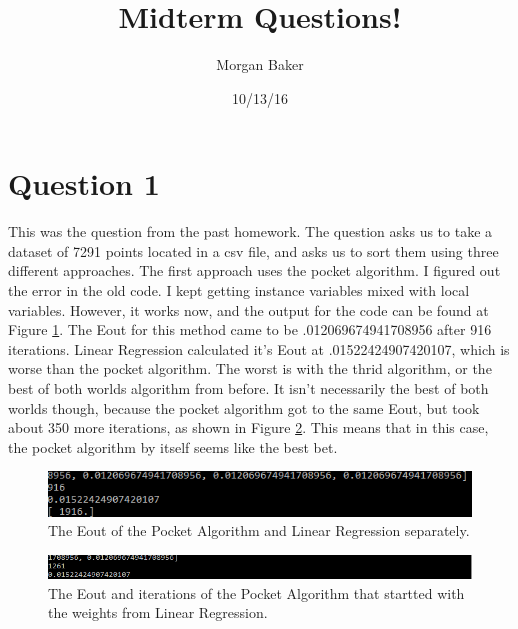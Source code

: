 \documentclass[a4paper]{article}
\title{Midterm Questions!}
\author{Morgan Baker}
\date{10/13/16}
\begin{document}
\lstset{language=Python}

\maketitle

\section{Question 1}
This was the question from the past homework. The question asks us to take a dataset of 7291 points located in a csv file, and asks us to sort them using three different approaches. The first approach uses the pocket algorithm. I figured out the error in the old code. I kept getting instance variables mixed with local variables. However, it works now, and the output for the code can be found at Figure \ref{fig:Figure1}. The Eout for this method came to be .012069674941708956 after 916 iterations. Linear Regression calculated it's Eout at .01522424907420107, which is worse than the pocket algorithm. The worst is with the thrid algorithm, or the best of both worlds algorithm from before. It isn't necessarily the best of both worlds though, because the pocket algorithm got to the same Eout, but took about 350 more iterations, as shown in Figure \ref{fig:Figure2}. This means that in this case, the pocket algorithm by itself seems like the best bet. 
\begin{figure}
  \includegraphics[width=\linewidth]{figure1.png}
  \caption{The Eout of the Pocket Algorithm and Linear Regression separately.}
  \label{fig:Figure1}
\end{figure}
\begin{figure}
  \includegraphics[width=\linewidth]{figure2.png}
  \caption{The Eout and iterations of the Pocket Algorithm that startted with the weights from Linear Regression.}
  \label{fig:Figure2}
\end{figure}
\end{document}
